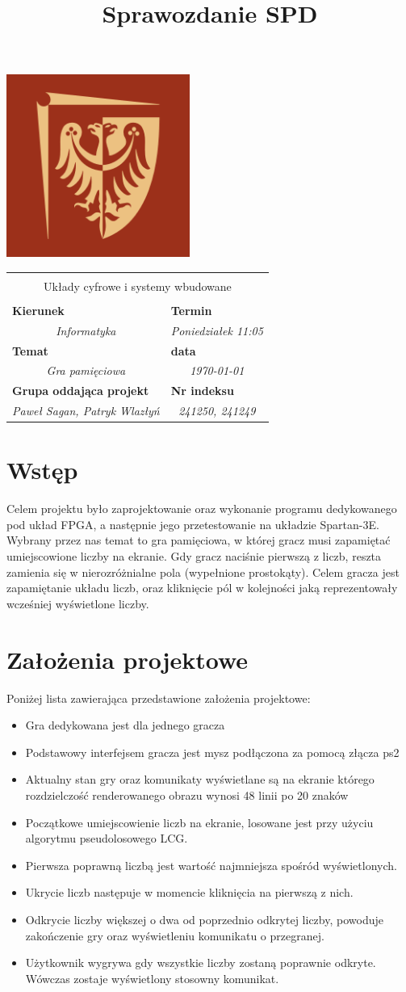 \documentclass[polish,polish,a4paper]{article}
\title{Sprawozdanie SPD}
\newcommand{\name}[1]{\sffamily\bfseries\scriptsize #1}
\newcommand{\frontpage}[8]{

\vspace{2cm}

\begin{tabular}{|p{0.72\textwidth}|p{0.28\textwidth}|}
\hline
\multicolumn{2}{|c|}{}\\
\multicolumn{2}{|c|}{{\LARGE #1}}\\
\multicolumn{2}{|c|}{}\\
\hline
\name{Kierunek} & \name{Termin}\\
\multicolumn{1}{|c|}{\textit{#2}} & \multicolumn{1}{|c|}{\textit{#3}} \\
\hline
\name{Temat} & \name{data}\\
\multicolumn{1}{|c|}{\textit{#4}} & \multicolumn{1}{|c|}{\textit{#5}} \\
\hline
\name{Grupa oddająca projekt} & \name{Nr indeksu}\\
\multicolumn{1}{|c|}{\textit{#6}} & \multicolumn{1}{|c|}{\textit{#7}} \\
\hline
\end{tabular}
}
\begin{document}
\includegraphics[width=6cm]{PWr.png}
\frontpage{Układy cyfrowe i systemy wbudowane}{Informatyka}{Poniedziałek 11:05}{Gra pamięciowa}{\today}{Paweł Sagan, Patryk Wlazłyń}{241250, 241249}
\pagestyle{}
\newpage
\tableofcontents
\newpage
\section{Wstęp}
Celem projektu było zaprojektowanie oraz wykonanie programu dedykowanego pod układ FPGA, a następnie jego przetestowanie na układzie Spartan-3E.
Wybrany przez nas temat to gra pamięciowa, w której gracz musi zapamiętać umiejscowione liczby na ekranie.
Gdy gracz naciśnie pierwszą z liczb, reszta zamienia się w nierozróżnialne pola (wypełnione prostokąty).
Celem gracza jest zapamiętanie układu liczb, oraz kliknięcie pól w kolejności jaką reprezentowały wcześniej wyświetlone liczby.

\section{Założenia projektowe}
Poniżej lista zawierająca przedstawione założenia projektowe:
\begin{itemize}
  \item Gra dedykowana jest dla jednego gracza
  \item Podstawowy interfejsem gracza jest mysz podłączona za pomocą złącza ps2
  \item Aktualny stan gry oraz komunikaty wyświetlane są na ekranie którego rozdzielczość renderowanego obrazu wynosi 48 linii po 20 znaków
  \item Początkowe umiejscowienie liczb na ekranie, losowane jest przy użyciu algorytmu pseudolosowego LCG.
  \item Pierwsza poprawną liczbą jest wartość najmniejsza spośród wyświetlonych.
  \item Ukrycie liczb następuje w momencie kliknięcia na pierwszą z nich.
  \item Odkrycie liczby większej o dwa od poprzednio odkrytej liczby, powoduje zakończenie gry oraz wyświetleniu komunikatu o przegranej.
  \item Użytkownik wygrywa gdy wszystkie liczby zostaną poprawnie odkryte. Wówczas zostaje wyświetlony stosowny komunikat.
\end{itemize}
\end{document}
